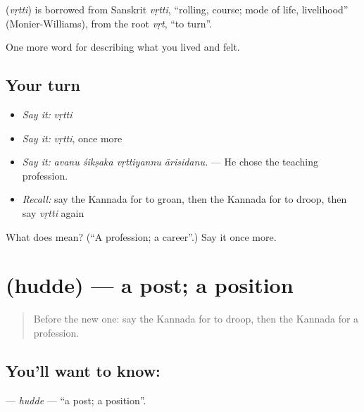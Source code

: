 \begin{cousinweb}
\textbf{} (\emph{vṛtti}) is borrowed from Sanskrit \emph{vṛtti}, \textquotedblleft{}rolling, course; mode of life, livelihood\textquotedblright{} (Monier-Williams), from the root \emph{vṛt}, \textquotedblleft{}to turn\textquotedblright{}.
\end{cousinweb}

\begin{grammarlens}[title={What you've built}]
One more word for describing what you lived and felt.
\end{grammarlens}

\subsection*{Your turn}
\begin{itemize}
\raggedright
  \item \emph{Say it:} \emph{vṛtti}
  \item \emph{Say it:} \emph{vṛtti}, once more
  \item \emph{Say it:} \emph{avanu śikṣaka vṛttiyannu ārisidanu.} — He chose the teaching profession.
  \item \emph{Recall:} say the Kannada for to groan, then the Kannada for to droop, then say \emph{vṛtti} again
\end{itemize}

\begin{tcolorbox}[breakable,colback=teal!4,colframe=teal!35!black,title={Before you move on}]
What does  mean? (\textquotedblleft{}A profession; a career\textquotedblright{}.) Say it once more.
\end{tcolorbox}
\section[\texorpdfstring{\kn{ಹುದ್ದೆ} (hudde)}{ಹುದ್ದೆ (hudde)}]{ (hudde) — a post; a position}

\label{lesson:KA-C516-hudde}



\begin{quote}
Before the new one: say the Kannada for to droop, then the Kannada for a profession.
\end{quote}

\subsection*{You'll want to know: }
\textbf{} — \emph{hudde} — \textquotedblleft{}a post; a position\textquotedblright{}.

